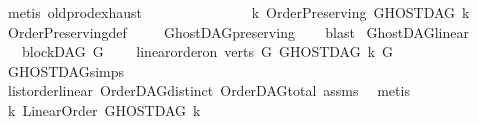 \begin{isabellebody}
\ {\isacharparenleft}{\kern0pt}metis\ old{\isachardot}{\kern0pt}prod{\isachardot}{\kern0pt}exhaust{\isacharparenright}{\kern0pt}\isanewline
\ \ \ \ \ \ \isamarkupfalse%
\isanewline
\ \ \ \ \isamarkupfalse%
\isanewline
\ \ \isamarkupfalse%
\isanewline
{}\isamarkupfalse%
%
\endisatagproof
{\isafoldproof}%
%
\isadelimproof
\isanewline
%
\endisadelimproof
\isanewline
\isanewline
{}\isamarkupfalse%
\ {\isachardoublequoteopen}{\isasymforall}k{\isachardot}{\kern0pt}\ Order{\isacharunderscore}{\kern0pt}Preserving\ {\isacharparenleft}{\kern0pt}GHOSTDAG\ k{\isacharparenright}{\kern0pt}{\isachardoublequoteclose}\isanewline
%
\isadelimproof
\ \ %
\endisadelimproof
%
\isatagproof
{}\isamarkupfalse%
\ Order{\isacharunderscore}{\kern0pt}Preserving{\isacharunderscore}{\kern0pt}def\ \isanewline
\ \ \isamarkupfalse%
\ GhostDAG{\isacharunderscore}{\kern0pt}preserving\isanewline
\ \ \isamarkupfalse%
\ blast%
\endisatagproof
{\isafoldproof}%
%
\isadelimproof
%
\endisadelimproof
%
\isadelimdocument
%
\endisadelimdocument
%
\isatagdocument
%
\isamarkuptrue%
%
\endisatagdocument
{\isafolddocument}%
%
\isadelimdocument
%
\endisadelimdocument
{}\isamarkupfalse%
\ GhostDAG{\isacharunderscore}{\kern0pt}linear{\isacharcolon}{\kern0pt}\ \isanewline
\ \ \ {\isachardoublequoteopen}blockDAG\ G{\isachardoublequoteclose}\ \isanewline
\ \ \ {\isachardoublequoteopen}linear{\isacharunderscore}{\kern0pt}order{\isacharunderscore}{\kern0pt}on\ {\isacharparenleft}{\kern0pt}verts\ G{\isacharparenright}{\kern0pt}\ {\isacharparenleft}{\kern0pt}GHOSTDAG\ k\ G{\isacharparenright}{\kern0pt}{\isachardoublequoteclose}\isanewline
%
\isadelimproof
\ \ %
\endisadelimproof
%
\isatagproof
{}\isamarkupfalse%
\ GHOSTDAG{\isachardot}{\kern0pt}simps\ \isanewline
\ \ \isamarkupfalse%
\ list{\isacharunderscore}{\kern0pt}order{\isacharunderscore}{\kern0pt}linear\ OrderDAG{\isacharunderscore}{\kern0pt}distinct\ OrderDAG{\isacharunderscore}{\kern0pt}total\ assms\ \isamarkupfalse%
\ metis%
\endisatagproof
{\isafoldproof}%
%
\isadelimproof
\isanewline
%
\endisadelimproof
\isanewline
{}\isamarkupfalse%
\ {\isachardoublequoteopen}{\isasymforall}k{\isachardot}{\kern0pt}\ Linear{\isacharunderscore}{\kern0pt}Order\ {\isacharparenleft}{\kern0pt}GHOSTDAG\ k{\isacharparenright}{\kern0pt}{\isachardoublequoteclose}\isanewline
%
\isadelimproof

\end{isabellebody}
